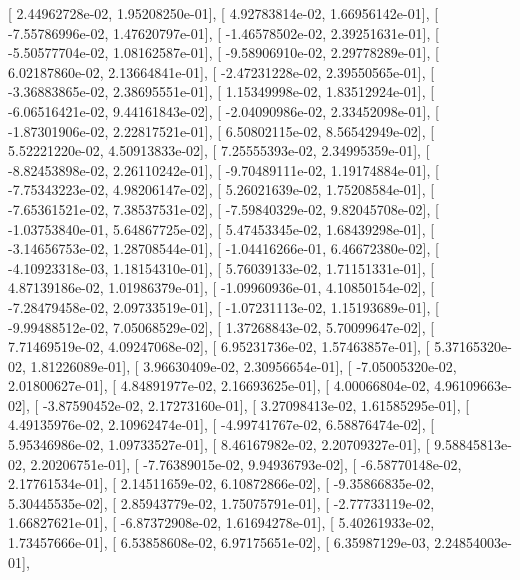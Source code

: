 \documentclass{article}
\begin{document}
       [  2.44962728e-02,   1.95208250e-01],
       [  4.92783814e-02,   1.66956142e-01],
       [ -7.55786996e-02,   1.47620797e-01],
       [ -1.46578502e-02,   2.39251631e-01],
       [ -5.50577704e-02,   1.08162587e-01],
       [ -9.58906910e-02,   2.29778289e-01],
       [  6.02187860e-02,   2.13664841e-01],
       [ -2.47231228e-02,   2.39550565e-01],
       [ -3.36883865e-02,   2.38695551e-01],
       [  1.15349998e-02,   1.83512924e-01],
       [ -6.06516421e-02,   9.44161843e-02],
       [ -2.04090986e-02,   2.33452098e-01],
       [ -1.87301906e-02,   2.22817521e-01],
       [  6.50802115e-02,   8.56542949e-02],
       [  5.52221220e-02,   4.50913833e-02],
       [  7.25555393e-02,   2.34995359e-01],
       [ -8.82453898e-02,   2.26110242e-01],
       [ -9.70489111e-02,   1.19174884e-01],
       [ -7.75343223e-02,   4.98206147e-02],
       [  5.26021639e-02,   1.75208584e-01],
       [ -7.65361521e-02,   7.38537531e-02],
       [ -7.59840329e-02,   9.82045708e-02],
       [ -1.03753840e-01,   5.64867725e-02],
       [  5.47453345e-02,   1.68439298e-01],
       [ -3.14656753e-02,   1.28708544e-01],
       [ -1.04416266e-01,   6.46672380e-02],
       [ -4.10923318e-03,   1.18154310e-01],
       [  5.76039133e-02,   1.71151331e-01],
       [  4.87139186e-02,   1.01986379e-01],
       [ -1.09960936e-01,   4.10850154e-02],
       [ -7.28479458e-02,   2.09733519e-01],
       [ -1.07231113e-02,   1.15193689e-01],
       [ -9.99488512e-02,   7.05068529e-02],
       [  1.37268843e-02,   5.70099647e-02],
       [  7.71469519e-02,   4.09247068e-02],
       [  6.95231736e-02,   1.57463857e-01],
       [  5.37165320e-02,   1.81226089e-01],
       [  3.96630409e-02,   2.30956654e-01],
       [ -7.05005320e-02,   2.01800627e-01],
       [  4.84891977e-02,   2.16693625e-01],
       [  4.00066804e-02,   4.96109663e-02],
       [ -3.87590452e-02,   2.17273160e-01],
       [  3.27098413e-02,   1.61585295e-01],
       [  4.49135976e-02,   2.10962474e-01],
       [ -4.99741767e-02,   6.58876474e-02],
       [  5.95346986e-02,   1.09733527e-01],
       [  8.46167982e-02,   2.20709327e-01],
       [  9.58845813e-02,   2.20206751e-01],
       [ -7.76389015e-02,   9.94936793e-02],
       [ -6.58770148e-02,   2.17761534e-01],
       [  2.14511659e-02,   6.10872866e-02],
       [ -9.35866835e-02,   5.30445535e-02],
       [  2.85943779e-02,   1.75075791e-01],
       [ -2.77733119e-02,   1.66827621e-01],
       [ -6.87372908e-02,   1.61694278e-01],
       [  5.40261933e-02,   1.73457666e-01],
       [  6.53858608e-02,   6.97175651e-02],
       [  6.35987129e-03,   2.24854003e-01],
\end{document}
